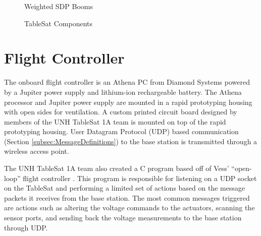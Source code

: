 
\begin{figure}[ht]
  \centerline{}
  \caption{Weighted SDP Booms}
  \label{fig:WeightedSDPBooms}
\end{figure}


\begin{figure}[H]
\centerline{}
\caption{TableSat Components}
\label{fig:TSatComponents}
\end{figure}

\section{Flight Controller}
\label{sec:FlightController}

The onboard flight controller is an Athena PC from Diamond Systems powered by a Jupiter power supply and lithium-ion rechargeable battery.  The Athena processor and Jupiter power supply are mounted in a rapid prototyping housing with open sides for ventilation.  A custom printed circuit board designed by members of the UNH TableSat 1A team is mounted on top of the rapid prototyping housing.  User Datagram Protocol (UDP) based communication (Section \ref{subsec:MessageDefinitions}) to the base station is transmitted through a wireless access point.

The UNH TableSat 1A team also created a C program based off of Vess' ``open-loop'' flight controller \cite{vessthesis} .  This program is responsible for listening on a UDP socket on the TableSat and performing a limited set of actions based on the message packets it receives from the base station.  The most common messages triggered are actions such as altering the voltage commands to the actuators, scanning the sensor ports, and sending back the voltage measurements to the base station through UDP.

